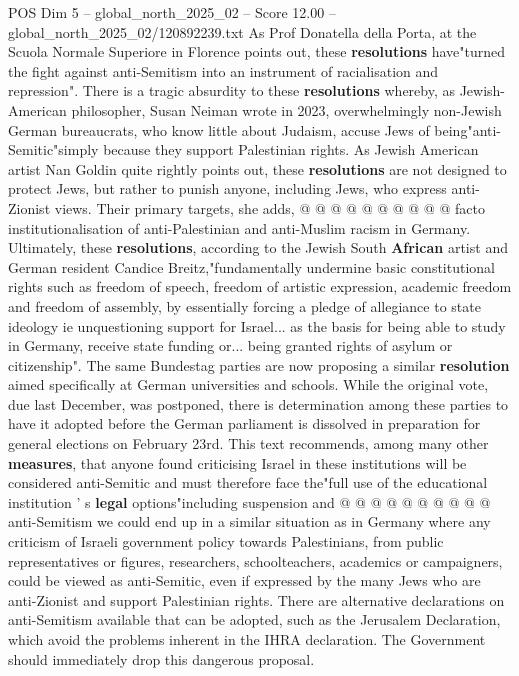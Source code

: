 \begin{textsample}{POS Dim 5 – global\_north\_2025\_02 – Score 12.00 – global\_north\_2025\_02/120892239.txt}
As Prof Donatella della Porta, at the Scuola Normale Superiore in Florence points out, these \textbf{resolutions} have"turned the fight against anti-Semitism into an instrument of racialisation and repression".
There is a tragic absurdity to these \textbf{resolutions} whereby, as Jewish-American philosopher, Susan Neiman wrote in 2023, overwhelmingly non-Jewish German bureaucrats, who know little about Judaism, accuse Jews of being"anti-Semitic"simply because they support Palestinian rights.
As Jewish American artist Nan Goldin quite rightly points out, these \textbf{resolutions} are not designed to protect Jews, but rather to punish anyone, including Jews, who express anti-Zionist views.
Their primary targets, she adds, @ @ @ @ @ @ @ @ @ @ facto institutionalisation of anti-Palestinian and anti-Muslim racism in Germany.
Ultimately, these \textbf{resolutions}, according to the Jewish South \textbf{African} artist and German resident Candice Breitz,"fundamentally undermine basic constitutional rights such as freedom of speech, freedom of artistic expression, academic freedom and freedom of assembly, by essentially forcing a pledge of allegiance to state ideology ie unquestioning support for Israel... as the basis for being able to study in Germany, receive state funding or... being granted rights of asylum or citizenship".
The same Bundestag parties are now proposing a similar \textbf{resolution} aimed specifically at German universities and schools.
While the original vote, due last December, was postponed, there is determination among these parties to have it adopted before the German parliament is dissolved in preparation for general elections on February 23rd.
This text recommends, among many other \textbf{measures}, that anyone found criticising Israel in these institutions will be considered anti-Semitic and must therefore face the"full use of the educational institution ' s \textbf{legal} options"including suspension and @ @ @ @ @ @ @ @ @ @ anti-Semitism we could end up in a similar situation as in Germany where any criticism of Israeli government policy towards Palestinians, from public representatives or figures, researchers, schoolteachers, academics or campaigners, could be viewed as anti-Semitic, even if expressed by the many Jews who are anti-Zionist and support Palestinian rights.
There are alternative declarations on anti-Semitism available that can be adopted, such as the Jerusalem Declaration, which avoid the problems inherent in the IHRA declaration.
The Government should immediately drop this dangerous proposal.

\end{textsample}
